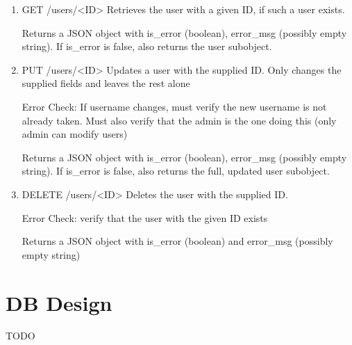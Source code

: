 \documentclass[12pt]{article}
\begin{document}
\begin{enumerate}
\item GET /users/<ID>
Retrieves the user with a given ID, if such a user exists. 

Returns a JSON object with is\_error (boolean), error\_msg (possibly empty string). If is\_error is false, also returns the user subobject. 

\item PUT /users/<ID>
Updates a user with the supplied ID. Only changes the supplied fields and leaves the rest alone

Error Check: If username changes, must verify the new username is not already taken. Must also verify that the admin is the one doing this (only admin can modify users)

Returns a JSON object with is\_error (boolean), error\_msg (possibly empty string). If is\_error is false, also returns the full, updated user subobject. 

\item DELETE /users/<ID>
Deletes the user with the supplied ID. 

Error Check: verify that the user with the given ID exists

Returns a JSON object with is\_error (boolean) and error\_msg (possibly empty string)
\end{enumerate}

\clearpage
\section{DB Design}
{\huge TODO}
\label{appendix:DBDesign}
\end{document}
